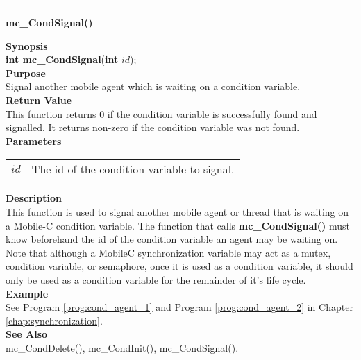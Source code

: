 \noindent
\vspace{5pt}
\rule{6.5in}{0.015in}
\noindent
{}
{\LARGE \bf mc\_CondSignal()}\\
\label{api:mc_CondSignal()}

\noindent
{\bf Synopsis}\\
{\bf int mc\_CondSignal}({\bf int} $id$);\\

\noindent
{\bf Purpose}\\
Signal another mobile agent which is waiting on a condition variable.\\

\noindent
{\bf Return Value}\\
This function returns 0 if the condition variable is successfully found and
signalled.
It returns non-zero if the condition variable was not found.\\

\noindent
{\bf Parameters}
\vspace{-0.1in}
\begin{description}
\item
\begin{tabular}{p{10 mm}p{145 mm}}
$id$ & The id of the condition variable to signal.
\end{tabular}
\end{description}

\noindent
{\bf Description}\\
This function is used to signal another mobile agent or thread that is 
waiting on a Mobile-C condition variable. 
The function that calls {\bf mc\_CondSignal()} must know beforehand the id of 
the condition variable an agent may be waiting on.
Note that although a MobileC synchronization variable may act as a mutex, 
condition variable, or semaphore, once it is used as a condition variable,
it should only be used as a condition variable for the remainder of it's 
life cycle.\\

\noindent
{\bf Example}\\
\noindent
See Program \vref{prog:cond_agent_1} and Program
\vref{prog:cond_agent_2} in Chapter \ref{chap:synchronization}.\\
\noindent
{\bf See Also}\\
mc\_CondDelete(), mc\_CondInit(), mc\_CondSignal().\\

